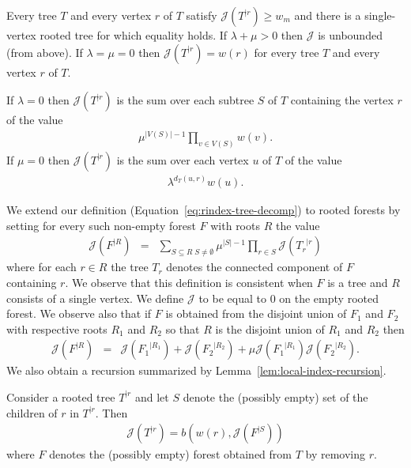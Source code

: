 \documentclass[11 pt]{modarticle}
\newcommand{\wmap}{w}
\newcommand{\wmin}{w_m}
\newcommand{\size}[1]{|#1|}
\newcommand{\vsetof}[1]{V(#1)}
\newcommand{\distance}[3]{d_{#3}(#1,#2)}
\newcommand{\rtree}[2]{{#1}^{\lvert #2}}
\newcommand{\bilinear}{b}
\newcommand{\rindexsymbol}{\mathcal{J}}
\newcommand{\rindex}[2]{\rindexsymbol(\rtree{#2}{#1})}
\begin{document}
\begin{rem}\label{rem:rindex-minimum-value}
Every tree $T$ and every vertex $r$ of $T$ satisfy $\rindex{r}{T} \geq \wmin$ and there is a single-vertex rooted tree for which equality holds. If $\lambda + \mu > 0$ then $\rindexsymbol$ is unbounded (from above). If $\lambda = \mu = 0$ then $\rindex{r}{T} = \wmap(r)$ for every tree $T$ and every vertex $r$ of $T$.
\end{rem}

\begin{rem}\label{rem:rooted-examples}
If $\lambda = 0$ then $\rindex{r}{T}$ is the sum over each subtree $S$ of $T$ containing the vertex $r$ of the value
\begin{eqnarray*}
	\mu^{\size{\vsetof{S}}-1} \underset{v \in \vsetof{S}}{\prod} \wmap(v).
\end{eqnarray*}
If $\mu = 0$ then $\rindex{r}{T}$ is the sum over each vertex $u$ of $T$ of the value
\begin{eqnarray*}
	\lambda^{\distance{u}{r}{T}} \wmap(u).
\end{eqnarray*}
\end{rem}

We extend our definition (Equation~\eqref{eq:rindex-tree-decomp}) to rooted forests by setting for every such non-empty forest $F$ with roots $R$ the value
\begin{eqnarray*}
	\rindex{R}{F} & = & \underset{S \subseteq R \; S \neq \emptyset}{\sum} \mu^{\size{S} - 1} \underset{r \in S}{\prod} \rindex{r}{T_r}
\end{eqnarray*}
where for each $r \in R$ the tree $T_r$ denotes the connected component of $F$ containing $r$. We observe that this definition is consistent when $F$ is a tree and $R$ consists of a single vertex. We define $\rindexsymbol$ to be equal to $0$ on the empty rooted forest. We observe also that if $F$ is obtained from the disjoint union of $F_1$ and $F_2$ with respective roots $R_1$ and $R_2$ so that $R$ is the disjoint union of $R_1$ and $R_2$ then
\begin{eqnarray}
	\rindex{R}{F} & = & \rindex{R_1}{F_1} + \rindex{R_2}{F_2} + \mu \rindex{R_1}{F_1} \rindex{R_2}{F_2}. \label{eq:rindex-forest-decomp}
\end{eqnarray}
We also obtain a recursion summarized by Lemma~\ref{lem:local-index-recursion}.

\begin{lem}\label{lem:local-index-recursion}
	Consider a rooted tree $\rtree{T}{r}$ and let $S$ denote the (possibly empty) set of the children of $r$ in $\rtree{T}{r}$. Then
\begin{eqnarray*}
	\rindex{r}{T} = \bilinear(\wmap(r), \rindex{S}{F})
\end{eqnarray*}
where $F$ denotes the (possibly empty) forest obtained from $T$ by removing $r$.
\end{lem}
\end{document}
